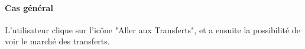 \paragraph{Cas général}
L'utilisateur clique sur l'icône "Aller aux Transferts", et a ensuite la possibilité  de voir le marché des transferts.


